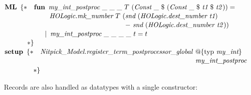 \documentclass[a4paper,12pt]{article}
\begin{document}
\prew
$\textbf{ML}~\,\{{*} \\
\!\begin{aligned}[t]
& \textbf{fun}\,~\textit{my\_int\_postproc}~\_~\_~\_~T~(\textit{Const}~\_~\$~(\textit{Const}~\_~\$~\textit{t1}~\$~\textit{t2\/})) = {} \\[-2pt]
& \phantom{fun}\,~\textit{HOLogic.mk\_number}~T~(\textit{snd}~(\textit{HOLogic.dest\_number~t1}) \\[-2pt]
& \phantom{fun\,~\textit{HOLogic.mk\_number}~T~(}{-}~\textit{snd}~(\textit{HOLogic.dest\_number~t2\/})) \\[-2pt]
& \phantom{fun}\!{\mid}\,~\textit{my\_int\_postproc}~\_~\_~\_~\_~t = t \\[-2pt]
{*}\}\end{aligned}$ \\[2\smallskipamount]
$\textbf{setup}~\,\{{*} \\
\!\begin{aligned}[t]
& \textit{Nitpick\_Model.register\_term\_postprocessor\_global\/}~\!\begin{aligned}[t]
  & @\{\textrm{typ}~\textit{my\_int}\} \\[-2pt]
  & \textit{my\_int\_postproc}\end{aligned} \\[-2pt]
{*}\}\end{aligned}$
\postw

Records are also handled as datatypes with a single constructor:
\end{document}
